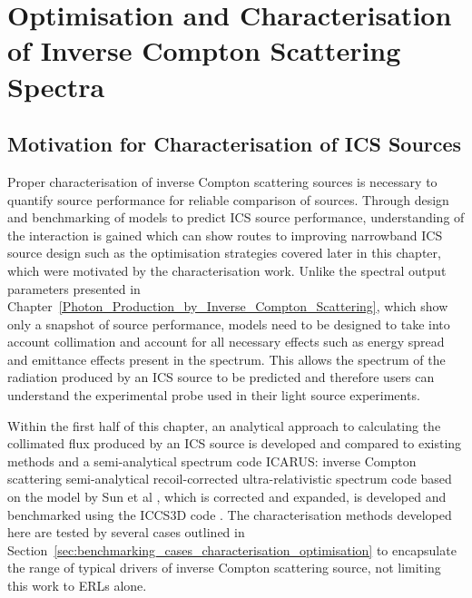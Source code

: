 \documentclass[../main.tex]{subfiles}
\begin{document}
\chapter{Optimisation and Characterisation of Inverse Compton Scattering Spectra}
\label{Optimisation_and_Characterisation_of_Inverse_Compton Scattering_Spectra} %

\section{Motivation for Characterisation of ICS Sources}

Proper characterisation of inverse Compton scattering sources is necessary to quantify source performance for reliable comparison of sources. Through design and benchmarking of models to predict ICS source performance, understanding of the interaction is gained which can show routes to improving narrowband ICS source design such as the optimisation strategies covered later in this chapter, which were motivated by the characterisation work. Unlike the spectral output parameters presented in Chapter~\ref{Photon_Production_by_Inverse_Compton_Scattering}, which show only a snapshot of source performance, models need to be designed to take into account collimation and account for all necessary effects such as energy spread and emittance effects present in the spectrum. This allows the spectrum of the radiation produced by an ICS source to be predicted and therefore users can understand the experimental probe used in their light source experiments.

Within the first half of this chapter, an analytical approach to calculating the collimated flux produced by an ICS source is developed and compared to existing methods \cite{curatolo2017analytical} and a semi-analytical spectrum code \textsc{ICARUS}: inverse Compton scattering semi-analytical recoil-corrected ultra-relativistic spectrum code based on the model by Sun et al \cite{sun2009characterizations,sun2011theoretical}, which is corrected and expanded, is developed and benchmarked using the \textsc{ICCS3D} code \cite{krafft2016laser,ranjan2018simulation}. The characterisation methods developed here are tested by several cases outlined in Section~\ref{sec:benchmarking_cases_characterisation_optimisation} to encapsulate the range of typical drivers of inverse Compton scattering source, not limiting this work to ERLs alone.
\end{document}
